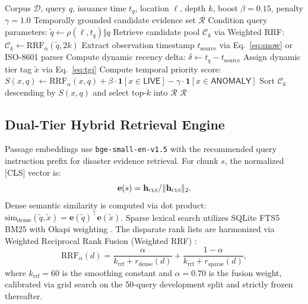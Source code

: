 \documentclass[conference]{IEEEtran}
\begin{document}
\begin{algorithm}[ht]\footnotesize
\caption{Dynamic Temporal Evidence Tagging and Retrieval}
\label{alg:tgi}
\begin{algorithmic}[1]
\REQUIRE Corpus $\mathcal{D}$, query $q$, issuance time $t_q$, location $\ell$, depth $k$, boost $\beta{=}0.15$, penalty $\gamma{=}1.0$
\ENSURE Temporally grounded candidate evidence set $\mathcal{R}$
\STATE Condition query parameters: $\tilde{q} \leftarrow \rho(\ell, t_q) \Vert q$
\STATE Retrieve candidate pool $\mathcal{C}_k$ via Weighted RRF: $\mathcal{C}_k \leftarrow \mathrm{RRF}_\alpha(\tilde{q}, 2k)$
  \STATE Extract observation timestamp $t_{\mathrm{source}}$ via Eq.~\eqref{eq:snow} or ISO-8601 parser
  \STATE Compute dynamic recency delta: $\delta \leftarrow t_q - t_{\mathrm{source}}$
  \STATE Assign dynamic tier tag $\tilde{x}$ via Eq.~\eqref{eq:tgi}
  \STATE Compute temporal priority score:
  \STATE \quad $S(x, q) \leftarrow \mathrm{RRF}_\alpha(x, q) + \beta\cdot\mathbf{1}[x \in \mathsf{LIVE}] - \gamma\cdot\mathbf{1}[x \in \mathsf{ANOMALY}]$
\ENDFOR
\STATE Sort $\mathcal{C}_k$ descending by $S(x, q)$ and select top-$k$ into $\mathcal{R}$
\RETURN $\mathcal{R}$
\end{algorithmic}
\end{algorithm}

\subsection{Dual-Tier Hybrid Retrieval Engine}
Passage embeddings use \texttt{bge-small-en-v1.5} \cite{bge} with the recommended query instruction prefix for disaster evidence retrieval. For chunk $s$, the normalized [CLS] vector is:
\begin{equation}
\mathbf{e}(s) = \mathbf{h}_{\textsc{cls}} / \lVert\mathbf{h}_{\textsc{cls}}\rVert_2.
\label{eq:emb}
\end{equation}
Dense semantic similarity is computed via dot product: $\mathrm{sim}_{\mathrm{dense}}(\tilde{q}, \tilde{x}) = \mathbf{e}(\tilde{q})^\top \mathbf{e}(\tilde{x})$. Sparse lexical search utilizes SQLite FTS5 BM25 with Okapi weighting \cite{bm25}. The disparate rank lists are harmonized via Weighted Reciprocal Rank Fusion (Weighted RRF) \cite{rrf}:
\begin{equation}
\mathrm{RRF}_{\alpha}(d) = \frac{\alpha}{k_{\mathrm{rrf}} + r_{\mathrm{dense}}(d)} + \frac{1 - \alpha}{k_{\mathrm{rrf}} + r_{\mathrm{sparse}}(d)},
\label{eq:rrf}
\end{equation}
where $k_{\mathrm{rrf}} = 60$ is the smoothing constant and $\alpha = 0.70$ is the fusion weight, calibrated via grid search on the 50-query development split and strictly frozen thereafter.
\end{document}
